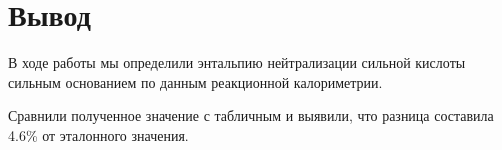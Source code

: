 \documentclass[a4paper]{article}
\begin{document}
\section*{\centering Вывод}

В ходе работы мы определили энтальпию нейтрализации сильной кислоты
сильным основанием по данным реакционной калориметрии.

Сравнили полученное значение с табличным и выявили,
что разница составила 4.6\% от эталонного значения.
\end{document}
